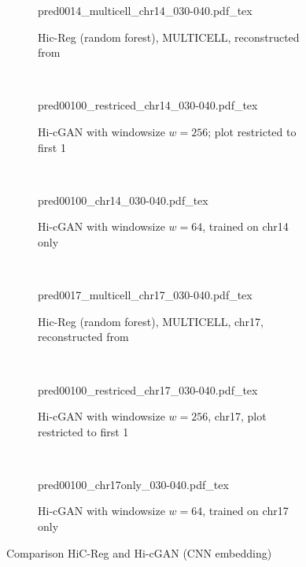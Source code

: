 \begin{figure}[htbp]
\begin{subfigure}{\textwidth}
 \centering
 \scriptsize
 {pred0014_multicell_chr14_030-040.pdf_tex}
 \caption{Hic-Reg (random forest), MULTICELL, reconstructed from \cite{Zhang2019}} \label{fig:results:zhang-vs-ours_matrices_multicell-14}
\end{subfigure}\\[5mm]
\begin{subfigure}{\textwidth}
 \centering
 \scriptsize
 {pred00100_restriced_chr14_030-040.pdf_tex}
 \caption{Hi-cGAN with windowsize $w=256$; plot restricted to first \SI{1}{\mega\bp}} \label{fig:results:zhang-vs-ours_matrices_ours-full-14}
\end{subfigure}\\[5mm]
\begin{subfigure}{\textwidth}
 \centering
 \scriptsize
 {pred00100_chr14_030-040.pdf_tex}
 \caption{Hi-cGAN with windowsize $w=64$, trained on chr14 only} \label{fig:results:zhang-vs-ours_matrices_ours-only-14}
\end{subfigure}\\[8mm]
\begin{subfigure}{\textwidth}
 \centering
 \scriptsize
 {pred0017_multicell_chr17_030-040.pdf_tex}
 \caption{Hic-Reg (random forest), MULTICELL, chr17, reconstructed from \cite{Zhang2019}} \label{fig:results:zhang-vs-ours_matrices_multicell-17}
\end{subfigure}\\[5mm]
\begin{subfigure}{\textwidth}
 \centering
 \scriptsize
 {pred00100_restriced_chr17_030-040.pdf_tex}
 \caption{Hi-cGAN with windowsize $w=256$, chr17, plot restricted to first \SI{1}{\mega\bp}}\label{fig:results:zhang-vs-ours_matrices_ours-full-17}
\end{subfigure}\\[5mm]
\begin{subfigure}{\textwidth}
 \centering
 \scriptsize
 {pred00100_chr17only_030-040.pdf_tex}
 \caption{Hi-cGAN with windowsize $w=64$, trained on chr17 only} \label{fig:results:zhang-vs-ours_matrices_ours-only-17}
\end{subfigure}
\caption{Comparison HiC-Reg \cite{Zhang2019} and Hi-cGAN (CNN embedding)} \label{fig:results:zhang-vs-ours_matrices}
\end{figure}


